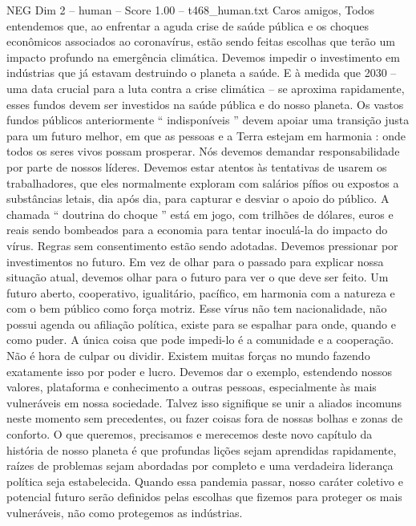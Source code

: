 \begin{textsample}{NEG Dim 2 – human – Score 1.00 – t468\_human.txt}  \label{ex:f2_neg_032}
Caros amigos, Todos entendemos que, ao enfrentar a aguda crise de saúde pública e os choques econômicos associados ao coronavírus, estão sendo feitas escolhas que terão um impacto profundo na emergência climática.
Devemos impedir o investimento em indústrias que já estavam destruindo o planeta a saúde.
E à medida que 2030 – uma data crucial para a luta contra a crise climática – se aproxima rapidamente, esses fundos devem ser investidos na saúde pública e do nosso planeta.
Os vastos fundos públicos anteriormente “ indisponíveis ” devem apoiar uma transição justa para um futuro melhor, em que as pessoas e a Terra estejam em harmonia : onde todos os seres vivos possam prosperar.
Nós devemos demandar responsabilidade por parte de nossos líderes.
Devemos estar atentos às tentativas de usarem os trabalhadores, que eles normalmente exploram com salários pífios ou expostos a substâncias letais, dia após dia, para capturar e desviar o apoio do público.
A chamada “ doutrina do choque ” está em jogo, com trilhões de dólares, euros e reais sendo bombeados para a economia para tentar inoculá-la do impacto do vírus.
Regras sem consentimento estão sendo adotadas.
Devemos pressionar por investimentos no futuro.
Em vez de olhar para o passado para explicar nossa situação atual, devemos olhar para o futuro para ver o que deve ser feito.
Um futuro aberto, cooperativo, igualitário, pacífico, em harmonia com a natureza e com o bem público como força motriz.
Esse vírus não tem nacionalidade, não possui agenda ou afiliação política, existe para se espalhar para onde, quando e como puder.
A única coisa que pode impedi-lo é a comunidade e a cooperação.
Não é hora de culpar ou dividir.
Existem muitas forças no mundo fazendo exatamente isso por poder e lucro.
Devemos dar o exemplo, estendendo nossos valores, plataforma e conhecimento a outras pessoas, especialmente às mais vulneráveis ​​em nossa sociedade.
Talvez isso signifique se unir a aliados incomuns neste momento sem precedentes, ou fazer coisas fora de nossas bolhas e zonas de conforto.
O que queremos, precisamos e merecemos deste novo capítulo da história de nosso planeta é que profundas lições sejam aprendidas rapidamente, raízes de problemas sejam abordadas por completo e uma verdadeira liderança política seja estabelecida.
Quando essa pandemia passar, nosso caráter coletivo e potencial futuro serão definidos pelas escolhas que fizemos para proteger os mais vulneráveis, não como protegemos as indústrias.

\end{textsample}
